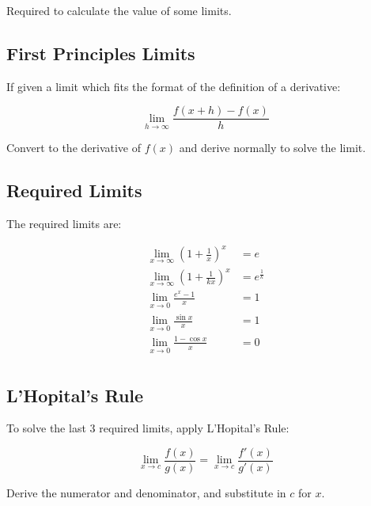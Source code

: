 \documentclass[a4paper,11pt]{article}
\begin{document}
Required to calculate the value of some limits.


\subsection{First Principles Limits}

If given a limit which fits the format of the definition of a derivative:

$$
\lim_{h \to \infty} \frac{f(x + h) - f(x)}{h}
$$

Convert to the derivative of $f(x)$ and derive normally to solve the limit.


\subsection{Required Limits}

The required limits are:

$$
\begin{aligned}
\lim_{x \to \infty} (1 + \frac{1}{x})^x & = e \\
\lim_{x \to \infty} (1 + \frac{1}{kx})^x & = e^{\frac{1}{k}} \\
\lim_{x \to 0} \frac{e^x - 1}{x} & = 1 \\
\lim_{x \to 0} \frac{\sin{x}}{x} & = 1 \\
\lim_{x \to 0} \frac{1 - \cos{x}}{x} & = 0 \\
\end{aligned}
$$


\subsection{L'Hopital's Rule}

To solve the last 3 required limits, apply L'Hopital's Rule:

$$
\lim_{x \to c} \frac{f(x)}{g(x)} = \lim_{x \to c} \frac{f'(x)}{g'(x)}
$$

Derive the numerator and denominator, and substitute in $c$ for $x$.
\end{document}
